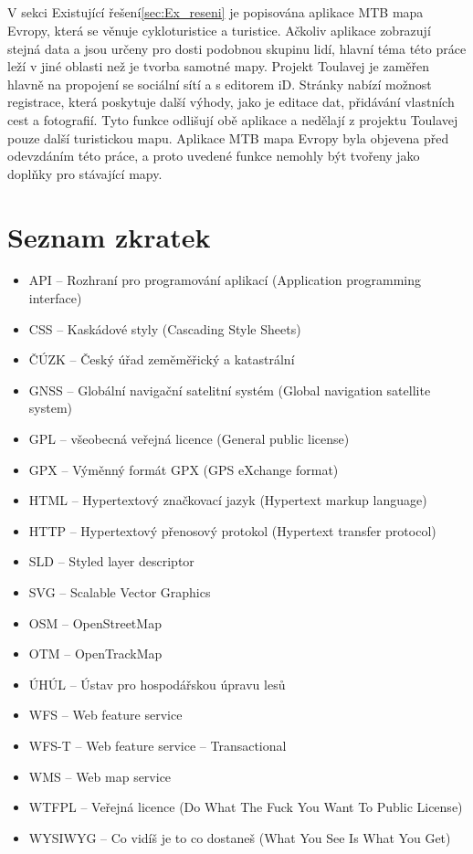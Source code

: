 \documentclass[11pt,a4paper,titlepage,oneside]{book}
\begin{document}
			\paragraph{} V sekci Existující řešení\ref{sec:Ex_reseni} je popisována aplikace MTB mapa Evropy, která se věnuje cykloturistice a turistice. Ačkoliv aplikace zobrazují stejná data a jsou určeny pro dosti podobnou skupinu lidí, hlavní téma této práce leží v jiné oblasti než je tvorba samotné mapy. Projekt Toulavej je zaměřen hlavně na propojení se sociální sítí a s editorem iD. Stránky  nabízí možnost registrace, která poskytuje další výhody, jako je editace dat, přidávání vlastních cest a fotografií. Tyto funkce odlišují obě aplikace a nedělají z projektu Toulavej pouze další turistickou mapu. Aplikace MTB mapa Evropy byla objevena před odevzdáním této práce, a proto uvedené funkce nemohly být tvořeny jako doplňky pro stávající mapy.



\newpage 
\chapter*{Seznam zkratek}
	\begin{itemize}
		\item API -- Rozhraní pro programování aplikací (Application programming interface)
		\item CSS -- Kaskádové styly (Cascading Style Sheets)
		\item ČÚZK -- Český úřad zeměměřický a katastrální
		\item GNSS -- Globální navigační satelitní systém (Global navigation satellite system)
		\item GPL -- všeobecná veřejná licence (General public license)
		\item GPX -- Výměnný formát GPX (GPS eXchange format)
		\item HTML -- Hypertextový značkovací jazyk (Hypertext markup language)
		\item HTTP -- Hypertextový přenosový protokol (Hypertext transfer protocol)
		\item SLD -- Styled layer descriptor
		\item SVG -- Scalable Vector Graphics
		\item OSM -- OpenStreetMap
		\item OTM -- OpenTrackMap
		\item ÚHÚL -- Ústav pro hospodářskou úpravu lesů
		\item WFS -- Web feature service
		\item WFS-T -- Web feature service -- Transactional
		\item WMS -- Web map service
		\item WTFPL -- Veřejná licence  (Do What The Fuck You Want To Public License)
		\item WYSIWYG -- Co vidíš je to co dostaneš (What You See Is What You Get)
	\end{itemize}
\end{document}
